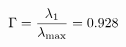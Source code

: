\documentclass[preview]{standalone}
\begin{document}
\begin{align*}
\special{dvisvgm:raw <g id='unique000'>}\Gamma = \frac{\lambda_1}{\lambda_{\max}} = 0.928\special{dvisvgm:raw </g>}
\end{align*}
\end{document}
